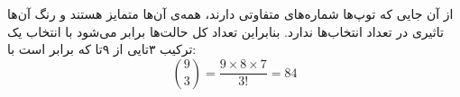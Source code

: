 \p
از آن جایی که توپ‌ها شماره‌های متفاوتی دارند، همه‌ی آن‌ها متمایز هستند و رنگ آن‌ها تاثیری در تعداد انتخاب‌ها ندارد. بنابراین تعداد کل حالت‌ها برابر می‌‌شود با انتخاب یک ترکیب ۳‌تایی از ۹‌تا که برابر است با:
  $${9\choose 3} = \frac{9\times 8\times 7}{3!} = 84$$